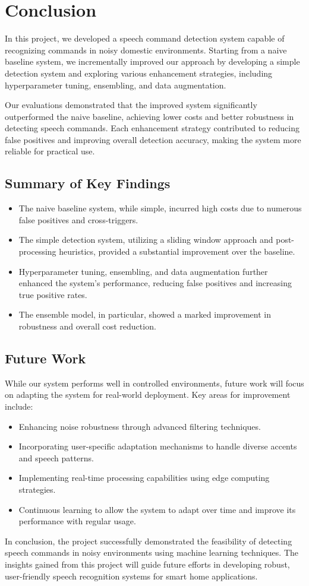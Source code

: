 \section{Conclusion}
In this project, we developed a speech command detection system capable of recognizing commands in noisy domestic environments. Starting from a naive baseline system, we incrementally improved our approach by developing a simple detection system and exploring various enhancement strategies, including hyperparameter tuning, ensembling, and data augmentation.

Our evaluations demonstrated that the improved system significantly outperformed the naive baseline, achieving lower costs and better robustness in detecting speech commands. Each enhancement strategy contributed to reducing false positives and improving overall detection accuracy, making the system more reliable for practical use.

\subsection{Summary of Key Findings}
\begin{itemize}
  \item The naive baseline system, while simple, incurred high costs due to numerous false positives and cross-triggers.
  \item The simple detection system, utilizing a sliding window approach and post-processing heuristics, provided a substantial improvement over the baseline.
  \item Hyperparameter tuning, ensembling, and data augmentation further enhanced the system's performance, reducing false positives and increasing true positive rates.
  \item The ensemble model, in particular, showed a marked improvement in robustness and overall cost reduction.
\end{itemize}

\subsection{Future Work}
While our system performs well in controlled environments, future work will focus on adapting the system for real-world deployment. Key areas for improvement include:
\begin{itemize}
  \item Enhancing noise robustness through advanced filtering techniques.
  \item Incorporating user-specific adaptation mechanisms to handle diverse accents and speech patterns.
  \item Implementing real-time processing capabilities using edge computing strategies.
  \item Continuous learning to allow the system to adapt over time and improve its performance with regular usage.
\end{itemize}

In conclusion, the project successfully demonstrated the feasibility of detecting speech commands in noisy environments using machine learning techniques. The insights gained from this project will guide future efforts in developing robust, user-friendly speech recognition systems for smart home applications.
